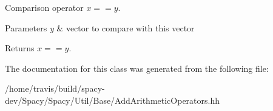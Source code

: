 Comparison operator $ x==y$. 


\begin{DoxyParams}{Parameters}
{\em y} & vector to compare with this vector \\
\hline
\end{DoxyParams}
\begin{DoxyReturn}{Returns}
$ x==y$. 
\end{DoxyReturn}


The documentation for this class was generated from the following file\-:\begin{DoxyCompactItemize}
\item 
/home/travis/build/spacy-\/dev/\-Spacy/\-Spacy/\-Util/\-Base/Add\-Arithmetic\-Operators.\-hh\end{DoxyCompactItemize}
